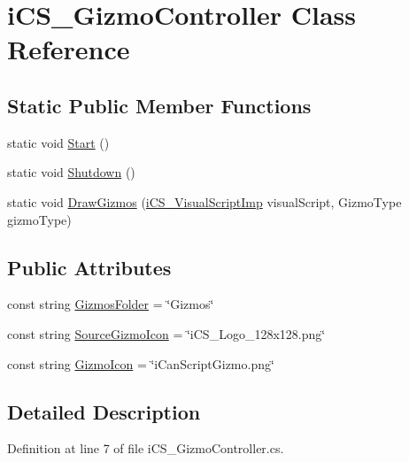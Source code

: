 \hypertarget{classi_c_s___gizmo_controller}{\section{i\+C\+S\+\_\+\+Gizmo\+Controller Class Reference}
\label{classi_c_s___gizmo_controller}
}
\subsection*{Static Public Member Functions}
\begin{DoxyCompactItemize}
\item 
static void \hyperlink{classi_c_s___gizmo_controller_a4a2c8bd38c970e9053bc89bf421b7b1a}{Start} ()
\item 
static void \hyperlink{classi_c_s___gizmo_controller_a006245849dac2127d2320f84e1d4a3b9}{Shutdown} ()
\item 
static void \hyperlink{classi_c_s___gizmo_controller_a29fccd8c052d4f9515749e959dce6679}{Draw\+Gizmos} (\hyperlink{classi_c_s___visual_script_imp}{i\+C\+S\+\_\+\+Visual\+Script\+Imp} visual\+Script, Gizmo\+Type gizmo\+Type)
\end{DoxyCompactItemize}
\subsection*{Public Attributes}
\begin{DoxyCompactItemize}
\item 
const string \hyperlink{classi_c_s___gizmo_controller_a43644406108530d7771cda0f2d938539}{Gizmos\+Folder} = \char`\"{}Gizmos\char`\"{}
\item 
const string \hyperlink{classi_c_s___gizmo_controller_afc73f361975bbf26a031a0d1709fbc82}{Source\+Gizmo\+Icon} = \char`\"{}i\+C\+S\+\_\+\+Logo\+\_\+128x128.\+png\char`\"{}
\item 
const string \hyperlink{classi_c_s___gizmo_controller_a82de1b62eeef07fbe2a58b05f033e0dc}{Gizmo\+Icon} = \char`\"{}i\+Can\+Script\+Gizmo.\+png\char`\"{}
\end{DoxyCompactItemize}


\subsection{Detailed Description}


Definition at line 7 of file i\+C\+S\+\_\+\+Gizmo\+Controller.\+cs.



